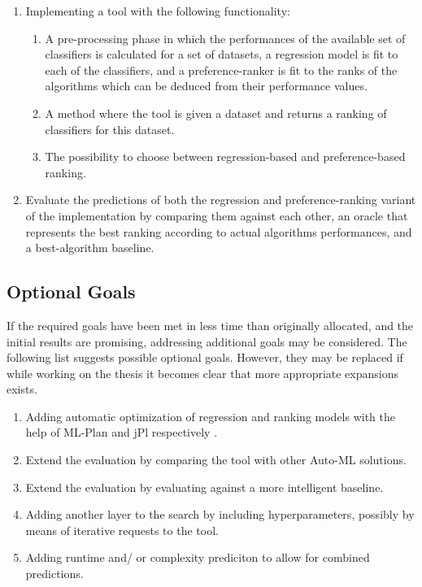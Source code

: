 \documentclass[12pt]{scrartcl}
\begin{document}
\begin{enumerate}
	\item Implementing a tool with the following functionality:
	\begin{enumerate}
		\item A pre-processing phase in which the performances of the available set of classifiers is calculated for a set of datasets, a regression model is fit to each of the classifiers, and a preference-ranker is fit to the ranks of the algorithms which can be deduced from their performance values.
		\item A method where the tool is given a dataset and returns a ranking of classifiers for this dataset.
		\item The possibility to choose between regression-based and preference-based ranking.
	\end{enumerate}
	\item Evaluate the predictions of both the regression and preference-ranking variant of the implementation by comparing them against each other, an oracle that represents the best ranking according to actual algorithms performances, and a best-algorithm baseline.
\end{enumerate}

\subsection{Optional Goals}\label{subsec:optional_goals}
If the required goals have been met in less time than originally allocated, and the initial results are promising, addressing additional goals may be considered. The following list suggests possible optional goals. However, they may be replaced if while working on the thesis it becomes clear that more appropriate expansions exists.

\begin{enumerate}
	\item Adding automatic optimization of regression and ranking models with the help of ML-Plan and jPl \footnotemark  respectively \cite{intelligent2017jpl}.
	\item Extend the evaluation by comparing the tool with other Auto-ML solutions.
	\item Extend the evaluation by evaluating against a more intelligent baseline.
	\item Adding another layer to the search by including hyperparameters, possibly by means of iterative requests to the tool.
	\item Adding runtime and/ or complexity prediciton to allow for combined predictions.
\end{enumerate}
\end{document}
